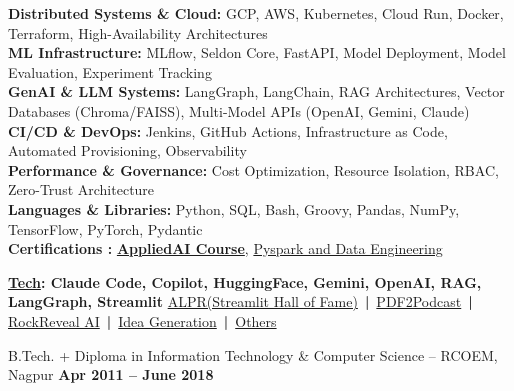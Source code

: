\documentclass[11pt, a4paper]{awesome-cv}
\begin{document}
\begin{cvparagraph}
\textbf{Distributed Systems \& Cloud:} GCP, AWS, Kubernetes, Cloud Run, Docker, Terraform, High-Availability Architectures \\
\textbf{ML Infrastructure:} MLflow, Seldon Core, FastAPI, Model Deployment, Model Evaluation, Experiment Tracking \\
\textbf{GenAI \& LLM Systems:} LangGraph, LangChain, RAG Architectures, Vector Databases (Chroma/FAISS), Multi-Model APIs (OpenAI, Gemini, Claude) \\
\textbf{CI/CD \& DevOps:} Jenkins, GitHub Actions, Infrastructure as Code, Automated Provisioning, Observability \\
\textbf{Performance \& Governance:} Cost Optimization, Resource Isolation, RBAC, Zero-Trust Architecture \\
\textbf{Languages \& Libraries:} Python, SQL, Bash, Groovy, Pandas, NumPy, TensorFlow, PyTorch, Pydantic \\
\textbf{Certifications :} \href{https://github.com/examplecandidate/Data-Science-Projects}{\textbf{AppliedAI Course}}, \href{https://drive.google.com/file/d/1jT354cGLbs9ZUIO4jf71Qiy5wZDAVQKI/view?usp=sharing}{Pyspark and Data Engineering} 
\end{cvparagraph}

\vspace{-1.0em}

\vspace{-0.5em}
\begin{cventries}
  \cventry
    {\textbf{\underline{Tech}: Claude Code, Copilot, HuggingFace, Gemini, OpenAI, RAG, LangGraph, Streamlit}}
    {
      \href{https://github.com/examplecandidate/Automatic-License-Plate-Recognition}{ALPR(Streamlit Hall of Fame)} \,\textbf{|}\,
      \href{https://github.com/examplecandidate/Data-Science-Projects/tree/master/NotebookLM_clone/PDF2Podcast}{PDF2Podcast} \,\textbf{|}\,
      \href{https://github.com/examplecandidate/Whats-this-rock}{RockReveal AI} \,\textbf{|}\,
      \href{https://github.com/examplecandidate/Idea_Generator}{Idea Generation} \,\textbf{|}\,
      \href{https://github.com/examplecandidate/Data-Science-Projects}{Others}
    }
    {}
    {}
    {}
\end{cventries}
\vspace{-2.0em}

\vspace{-0.4em}

\begin{cventries}
\cventry
{}
{B.Tech. + Diploma in Information Technology \& Computer Science – RCOEM, Nagpur}
{\textbf{Apr 2011 – June 2018}}
{}
{}
\end{cventries}
\end{document}
